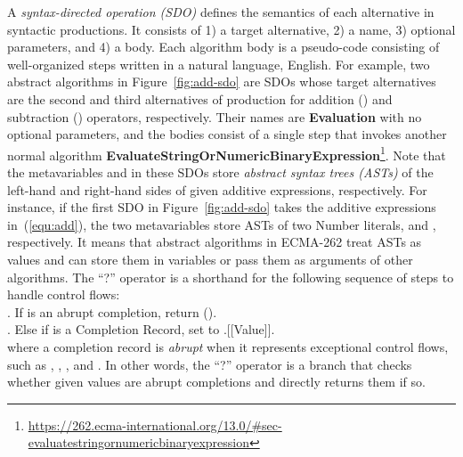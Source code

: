 
A \textit{syntax-directed operation (SDO)} defines the semantics of each
alternative in syntactic productions.
It consists of 1) a target alternative, 2) a name, 3) optional parameters, and 4) a body.
Each algorithm body is a pseudo-code consisting of well-organized steps written
in a natural language, English.
For example, two abstract algorithms in Figure~\ref{fig:add-sdo} are SDOs whose
target alternatives are the second and third alternatives of
 production for addition (\scode{+}) and subtraction
(\scode{-}) operators, respectively.
Their names are \textbf{Evaluation} with no optional parameters, and
the bodies consist of a single step that invokes another normal algorithm
\textbf{EvaluateStringOrNumericBinaryExpression}\footnote{
\url{https://262.ecma-international.org/13.0/\#sec-evaluatestringornumericbinaryexpression}}.
Note that the metavariables  and
 in these SDOs store \textit{abstract syntax
trees (ASTs)} of the left-hand and right-hand sides of given additive
expressions, respectively.
For instance, if the first SDO in Figure~\ref{fig:add-sdo} takes the additive
expressions in~(\ref{equ:add}), the two metavariables store ASTs of two Number
literals,  and , respectively.
It means that abstract algorithms in ECMA-262 treat ASTs as values and can
store them in variables or pass them as arguments of other algorithms.
The ``?'' operator is a shorthand for the following sequence of steps to handle control flows:
\vspace*{.5em}\\
{
  \noindent
  \null{}. If  is an abrupt completion, return
  ().
  \\
  \null{}. Else if  is a Completion Record, set
   to .[[Value]].
}
\vspace*{.5em}\\
where a completion record is \textit{abrupt} when it represents exceptional
control flows, such as , , , and
.
In other words, the ``?'' operator is a branch that checks whether given
values are abrupt completions and directly returns them if so.



